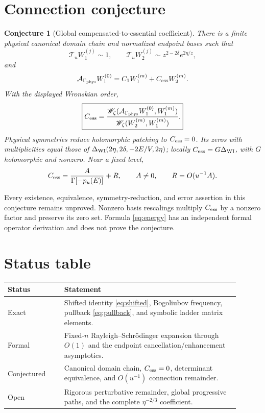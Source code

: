 \documentclass[11pt]{article}
\newtheorem{conjecture}{Conjecture}
\newcommand{\Wr}{\mathscr W}
\begin{document}
\section{Connection conjecture}

\begin{conjecture}[Global compensated-to-essential coefficient]
There is a finite physical canonical domain chain and normalized endpoint
bases such that
\[
\mathcal T_uW_1^{(j)}\sim1,\qquad
\mathcal T_uW_2^{(j)}\sim z^{2-2\delta}e^{2\eta/z},
\]
and
\[
\mathcal A_{\Gamma_{\rm phys}}W_1^{(0)}
=C_1W_1^{(m)}+C_{\rm ess}W_2^{(m)}.
\]
With the displayed Wronskian order,
\[
\boxed{C_{\rm ess}=
\frac{\Wr_\zeta(\mathcal A_{\Gamma_{\rm phys}}W_1^{(0)},W_1^{(m)})}
{\Wr_\zeta(W_2^{(m)},W_1^{(m)})}.}
\]
Physical symmetries reduce holomorphic patching to \(C_{\rm ess}=0\).
Its zeros with multiplicities equal those of
\(\Delta_{\rm WI}(2\eta,2\delta,-2E/V,2\eta)\); locally
\(C_{\rm ess}=G\Delta_{\rm WI}\), with \(G\) holomorphic and nonzero.
Near a fixed level,
\[
C_{\rm ess}=\frac{A}{\Gamma[-p_u(E)]}+R,\qquad A\ne0,\qquad
R=O(u^{-1}A).
\]
\end{conjecture}
Every existence, equivalence, symmetry-reduction, and error assertion in this
conjecture remains unproved.  Nonzero basis rescalings multiply
\(C_{\rm ess}\) by a nonzero factor and preserve its zero set.  Formula
\eqref{eq:energy} has an independent formal operator derivation and does not
prove the conjecture.

\section{Status table}
\begin{center}
\begin{tabular}{p{0.22\linewidth}p{0.68\linewidth}}
\hline
Status & Statement\\ \hline
Exact & Shifted identity \eqref{eq:shifted}, Bogoliubov frequency, pullback
\eqref{eq:pullback}, and symbolic ladder matrix elements.\\
Formal & Fixed-\(n\) Rayleigh--Schr\"odinger expansion through \(O(1)\) and
the endpoint cancellation/enhancement asymptotics.\\
Conjectured & Canonical domain chain, \(C_{\rm ess}=0\), determinant
equivalence, and \(O(u^{-1})\) connection remainder.\\
Open & Rigorous perturbative remainder, global progressive paths, and the
complete \(\eta^{-2/3}\) coefficient.\\ \hline
\end{tabular}
\end{center}
\end{document}
